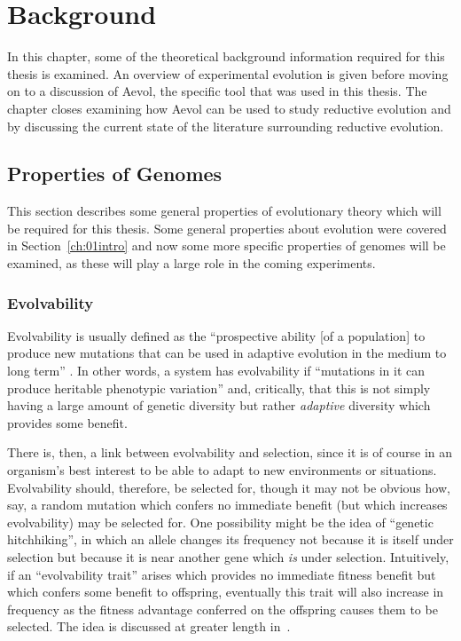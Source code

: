 \chapter{Background}\label{ch:02background}

In this chapter, some of the theoretical background information required for this thesis is examined. An overview of experimental evolution is given before moving on to a discussion of Aevol, the specific tool that was used in this thesis. The chapter closes examining how Aevol can be used to study reductive evolution and by discussing the current state of the literature surrounding reductive evolution.  

\section{Properties of Genomes}
This section describes some general properties of evolutionary theory which will be required for this thesis. Some general properties about evolution were covered in Section~\ref{ch:01intro} and now some more specific properties of genomes will be examined, as these will play a large role in the coming experiments. 

\subsection{Evolvability}\label{subsec:evolvability}
Evolvability is usually defined as the ``prospective ability [of a population] to produce new mutations that can be used in adaptive evolution in the medium to long term'' \cite{brookfield2009evolution}. In other words, a system has evolvability if ``mutations in it can produce heritable phenotypic variation''\cite{doi:10.1098/rspb.2007.1137} and, critically, that this is not simply having a large amount of genetic diversity but rather \textit{adaptive} diversity which provides some benefit. 

There is, then, a link between evolvability and selection, since it is of course in an organism's best interest to be able to adapt to new environments or situations. Evolvability should, therefore, be selected for, though it may not be obvious how, say, a random mutation which confers no immediate benefit (but which increases evolvability) may be selected for. One possibility might be the idea of ``genetic hitchhiking'', in which an allele changes its frequency not because it is itself under selection but because it is near another gene which \textit{is} under selection. Intuitively, if an ``evolvability trait'' arises which provides no immediate fitness benefit but which confers some benefit to offspring, eventually this trait will also increase in frequency as the fitness advantage conferred on the offspring causes them to be selected. The idea is discussed at greater length in~\cite{selectionEvolvability}. 


